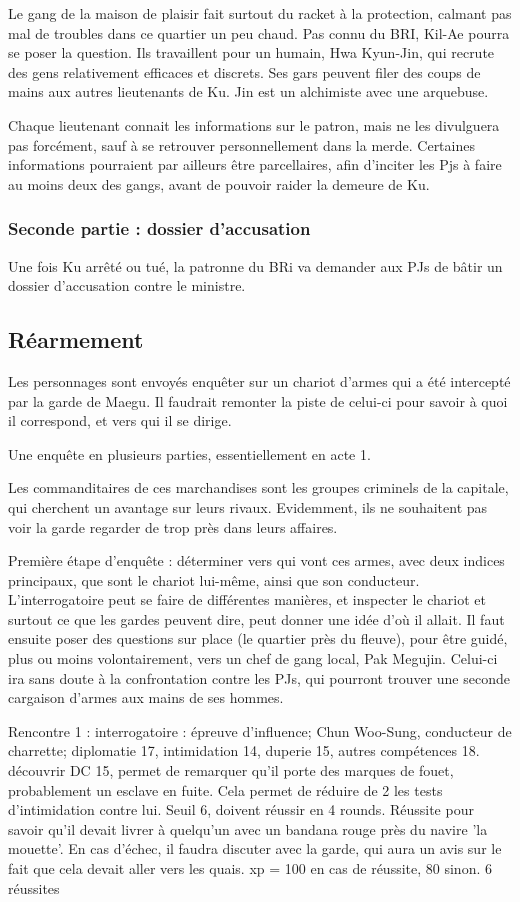 \documentclass[10pt,a4paper]{book}
\begin{document}
Le gang de la maison de plaisir fait surtout du racket à la protection, calmant pas mal de troubles dans ce quartier un peu chaud. Pas connu du BRI, Kil-Ae pourra se poser la question. Ils travaillent pour un humain, Hwa Kyun-Jin, qui recrute des gens relativement efficaces et discrets. Ses gars peuvent filer des coups de mains aux autres lieutenants de Ku. Jin est un alchimiste avec une arquebuse.

Chaque lieutenant connait les informations sur le patron, mais ne les divulguera pas forcément, sauf à se retrouver personnellement dans la merde. Certaines informations pourraient par ailleurs être parcellaires, afin d'inciter les Pjs à faire au moins deux des gangs, avant de pouvoir raider la demeure de Ku.
\subsubsection{Seconde partie : dossier d'accusation}
Une fois Ku arrêté ou tué, la patronne du BRi va demander aux PJs de bâtir un dossier d'accusation contre le ministre.

\subsection{Réarmement}
Les personnages sont envoyés enquêter sur un chariot d'armes qui a été intercepté par la garde de Maegu. Il faudrait remonter la piste de celui-ci pour savoir à quoi il correspond, et vers qui il se dirige.

Une enquête en plusieurs parties, essentiellement en acte 1.

Les commanditaires de ces marchandises sont les groupes criminels de la capitale, qui cherchent un avantage sur leurs rivaux. Evidemment, ils ne souhaitent pas voir la garde regarder de trop près dans leurs affaires.

Première étape d'enquête : déterminer vers qui vont ces armes, avec deux indices principaux, que sont le chariot lui-même, ainsi que son conducteur. L'interrogatoire peut se faire de différentes manières, et inspecter le chariot et surtout ce que les gardes peuvent dire, peut donner une idée d'où il allait. Il faut ensuite poser des questions sur place (le quartier près du fleuve), pour être guidé, plus ou moins volontairement, vers un chef de gang local, Pak Megujin. Celui-ci ira sans doute à la confrontation contre les PJs, qui pourront trouver une seconde cargaison d'armes aux mains de ses hommes.

Rencontre 1 : interrogatoire : épreuve d'influence; Chun Woo-Sung, conducteur de charrette; diplomatie 17, intimidation 14, duperie 15, autres compétences 18. découvrir DC 15, permet de remarquer qu'il porte des marques de fouet, probablement un esclave en fuite. Cela permet de réduire de 2 les tests d'intimidation contre lui. Seuil 6, doivent réussir en 4 rounds. Réussite pour savoir qu'il devait livrer à quelqu'un avec un bandana rouge près du navire 'la mouette'. En cas d'échec, il faudra discuter avec la garde, qui aura un avis sur le fait que cela devait aller vers les quais. xp = 100 en cas de réussite, 80 sinon. 6 réussites
\end{document}

